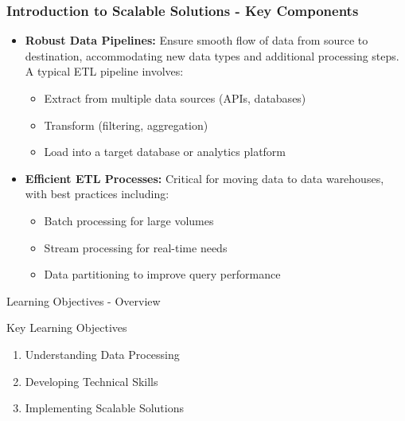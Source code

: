 \documentclass[aspectratio=169]{beamer}
\begin{document}
\begin{frame}[fragile]
    \frametitle{Introduction to Scalable Solutions - Key Components}
    \begin{itemize}
        \item \textbf{Robust Data Pipelines:}  
        Ensure smooth flow of data from source to destination, accommodating new data types and additional processing steps. A typical ETL pipeline involves:
        \begin{itemize}
            \item Extract from multiple data sources (APIs, databases)
            \item Transform (filtering, aggregation)
            \item Load into a target database or analytics platform
        \end{itemize}

        \item \textbf{Efficient ETL Processes:}  
        Critical for moving data to data warehouses, with best practices including:
        \begin{itemize}
            \item Batch processing for large volumes
            \item Stream processing for real-time needs
            \item Data partitioning to improve query performance
        \end{itemize}
    \end{itemize}
\end{frame}

\begin{frame}[fragile]{Learning Objectives - Overview}
    \begin{block}{Key Learning Objectives}
        \begin{enumerate}
            \item Understanding Data Processing
            \item Developing Technical Skills
            \item Implementing Scalable Solutions
        \end{enumerate}
    \end{block}
\end{frame}
\end{document}
